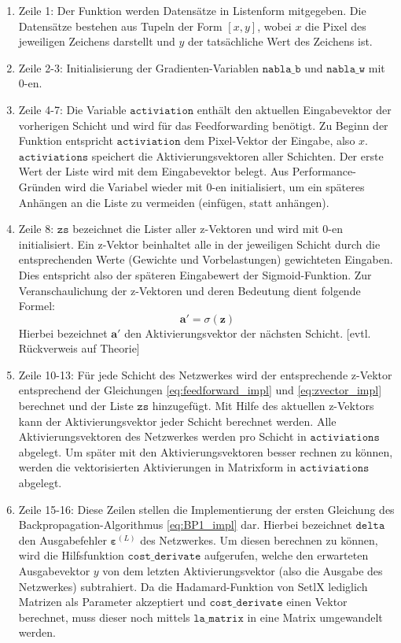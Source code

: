 \begin{enumerate}
\item Zeile 1: Der Funktion werden Datensätze in Listenform mitgegeben. Die Datensätze bestehen aus Tupeln der Form $[x,y]$, wobei $x$ die Pixel des jeweiligen Zeichens darstellt und $y$ der tatsächliche Wert des Zeichens ist.
\item Zeile 2-3: Initialisierung der Gradienten-Variablen $\mathtt{nabla\_b}$ und $\mathtt{nabla\_w}$ mit 0-en.
\item Zeile 4-7: Die Variable $\mathtt{activiation}$ enthält den aktuellen Eingabevektor der vorherigen Schicht und wird für das Feedforwarding benötigt. Zu Beginn der Funktion entspricht $\mathtt{activiation}$ dem Pixel-Vektor der Eingabe, also $x$. $\mathtt{activiations}$ speichert die Aktivierungsvektoren aller Schichten. Der erste Wert der Liste wird mit dem Eingabevektor belegt. Aus Performance-Gründen wird die Variabel wieder mit 0-en initialisiert, um ein späteres Anhängen an die Liste zu vermeiden (einfügen, statt anhängen).
\item Zeile 8: $\mathtt{zs}$ bezeichnet die Lister aller z-Vektoren und wird mit 0-en initialisiert. Ein z-Vektor beinhaltet alle in der jeweiligen Schicht durch die entsprechenden Werte (Gewichte und Vorbelastungen) gewichteten Eingaben. Dies entspricht also der späteren Eingabewert der Sigmoid-Funktion. Zur Veranschaulichung der z-Vektoren und deren Bedeutung dient folgende Formel:
\begin{equation} \label{eq:zvector_impl}
	\mathbf{a}' = \sigma(\mathbf{z})
\end{equation} 
Hierbei bezeichnet $\mathbf{a}'$ den Aktivierungsvektor der nächsten Schicht. [evtl. Rückverweis auf Theorie]
\item Zeile 10-13: Für jede Schicht des Netzwerkes wird der entsprechende z-Vektor entsprechend der Gleichungen \eqref{eq:feedforward_impl} und \eqref{eq:zvector_impl} berechnet und der Liste $\mathtt{zs}$ hinzugefügt. Mit Hilfe des aktuellen z-Vektors kann der Aktivierungsvektor jeder Schicht berechnet werden. Alle Aktivierungsvektoren des Netzwerkes werden pro Schicht in $\mathtt{activiations}$ abgelegt. Um später mit den Aktivierungsvektoren besser rechnen zu können, werden die vektorisierten Aktivierungen in Matrixform in $\mathtt{activiations}$ abgelegt.
\item Zeile 15-16: Diese Zeilen stellen die Implementierung der ersten Gleichung des Backpropagation-Algorithmus \eqref{eq:BP1_impl} dar. Hierbei bezeichnet $\mathtt{delta}$ den Ausgabefehler $\boldsymbol{\varepsilon}^{(L)}$ des Netzwerkes. Um diesen berechnen zu können, wird die Hilfsfunktion $\mathtt{cost\_derivate}$ aufgerufen, welche den erwarteten Ausgabevektor $y$ von dem letzten Aktivierungsvektor (also die Ausgabe des Netzwerkes) subtrahiert. Da die Hadamard-Funktion von SetlX lediglich Matrizen als Parameter akzeptiert und $\mathtt{cost\_derivate}$ einen Vektor berechnet, muss dieser noch mittels $\mathtt{la\_matrix}$ in eine Matrix umgewandelt werden.

\end{enumerate}
